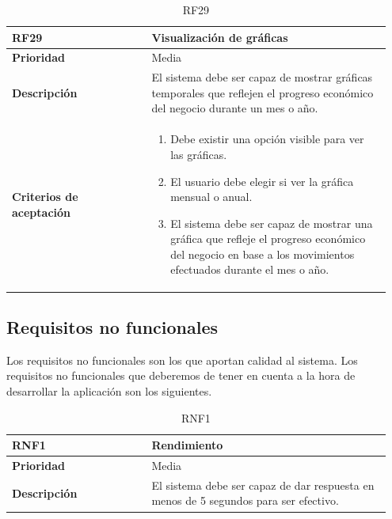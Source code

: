 \begin{table}[H]
	\centering %
	\begin{tabular}{|p{0.35\linewidth}|p{0.6\linewidth}|}
		\hline
		\rowcolor{grayshade} \textbf{RF29} & \textbf{Visualización de gráficas} \\
		\hline
		\textbf{Prioridad} & Media \\
		\hline
		\textbf{Descripción} & El sistema debe ser capaz de mostrar gráficas temporales que reflejen el progreso económico del negocio durante un mes o año.\\
		\hline
		\vspace{0.5mm}
		\textbf{Criterios de aceptación} & 
		\begin{minipage}[t]{0.9\linewidth}
			\begin{enumerate}
				\item Debe existir una opción visible para ver las gráficas.
				\item El usuario debe elegir si ver la gráfica mensual o anual. 
				\item El sistema debe ser capaz de mostrar una gráfica que refleje el progreso económico del negocio en base a los movimientos efectuados durante el mes o año.   
			\end{enumerate}
			\vspace{2mm}
		\end{minipage} \\
		\hline
	\end{tabular}
	\caption{RF29}
\end{table}


\newpage

\subsection{Requisitos no funcionales}

Los requisitos no funcionales son los que aportan calidad al sistema. Los requisitos no funcionales que deberemos de tener en cuenta a la hora de desarrollar la aplicación son los siguientes.

\begin{table}[H]
	\centering %
	\begin{tabular}{|p{0.35\linewidth}|p{0.6\linewidth}|}
		\hline
		\rowcolor{grayshade} \textbf{RNF1} & \textbf{Rendimiento} \\
		\hline
		\textbf{Prioridad} & Media \\
		\hline
		\textbf{Descripción} & El sistema debe ser capaz de dar respuesta en menos de 5 segundos para ser efectivo.\\
		\hline
	\end{tabular}
	\caption{RNF1}
\end{table}

